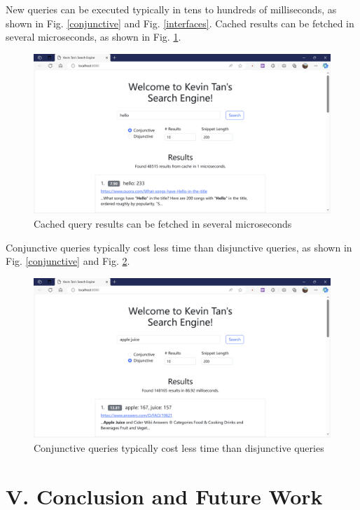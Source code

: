 \documentclass[12pt]{article}
\begin{document}
New queries can be executed typically in tens to hundreds of
milliseconds, as shown in Fig. \ref{conjunctive} and Fig. \ref{interfaces}. Cached results can be
fetched in several microseconds, as shown in Fig. \ref{cached}.

\begin{figure}[!h]
  \includegraphics{readme.assets/image-20231112215219633.png}
  \vspace{-8pt}
  \caption{Cached query results can be fetched in several microseconds}
  \label{cached}
\end{figure}

Conjunctive queries typically cost less time than disjunctive queries,
as shown in Fig. \ref{conjunctive} and Fig. \ref{disjunctive}.

\begin{figure}[!h]
  \includegraphics{readme.assets/image-20231112215247864.png}
  \vspace{-8pt}
  \caption{Conjunctive queries typically cost less time than disjunctive queries}
  \label{disjunctive}
\end{figure}

\hypertarget{v-conclusion-and-future-work}{%
\section{V. Conclusion and Future
Work}\label{v-conclusion-and-future-work}}
\end{document}
